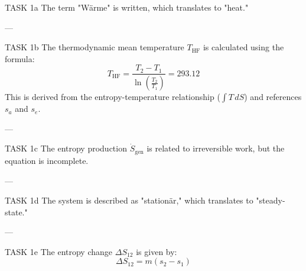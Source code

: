 TASK 1a  
The term "Wärme" is written, which translates to "heat."

---

TASK 1b  
The thermodynamic mean temperature \( T_{\text{HF}} \) is calculated using the formula:  
\[
T_{\text{HF}} = \frac{T_2 - T_1}{\ln\left(\frac{T_2}{T_1}\right)} = 293.12
\]  
This is derived from the entropy-temperature relationship (\( \int T \, dS \)) and references \( s_a \) and \( s_e \).

---

TASK 1c  
The entropy production \( \dot{S}_{\text{gen}} \) is related to irreversible work, but the equation is incomplete.

---

TASK 1d  
The system is described as "stationär," which translates to "steady-state."

---

TASK 1e  
The entropy change \( \Delta S_{12} \) is given by:  
\[
\Delta S_{12} = m \left(s_2 - s_1\right)
\]